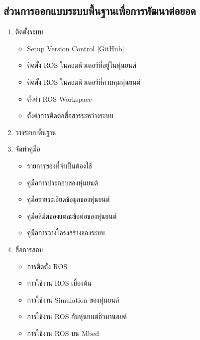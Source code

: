 \subsection{ส่วนการออกแบบระบบพื้นฐานเพื่อการพัฒนาต่อยอด}
\begin{enumerate}[label=\arabic*, leftmargin=1.5cm]
	
	\item ติดตั้งระบบ
	\begin{itemize}\setlength\itemsep{-0.3em}
		\item Setup Version Control [GitHub]
		\item ติดตั้ง ROS ในคอมพิวเตอร์ที่อยู่ในหุ่นยนต์
		\item ติดตั้ง ROS ในคอมพิวเตอร์ที่ควบคุมหุ่นยนต์
		\item ตั้งค่า ROS Workspace
		\item ตั้งค่าการติดต่อสื่อสารระหว่างระบบ
	\end{itemize}
	\item วางระบบพื้นฐาน
	\item จัดทำคู่มือ
	\begin{itemize}\setlength\itemsep{-0.3em}
		\item รายการของที่จำเป็นต้องใช้
		\item คู่มือการประกอบของหุ่นยนต์
		\item คู่มือรายระเอียดข้อมูลของหุ่นยนต์
		\item คู่มือลิมิตของแต่ละข้อต่อของหุ่นยนต์
		\item คู่มือการวางโครงสร้างของระบบ
	\end{itemize}
	\item สื่อการสอน
	\begin{itemize}\setlength\itemsep{-0.3em}
		\item การติดตั้ง ROS
		\item การใช้งาน ROS เบื้องต้น
		\item การใช้งาน Simulation ของหุ่นยนต์
		\item การใช้งาน ROS กับหุ่นยนต์ฮิวมานอยด์
		\item การใช้งาน ROS บน Mbed
	\end{itemize}
	
\end{enumerate}

